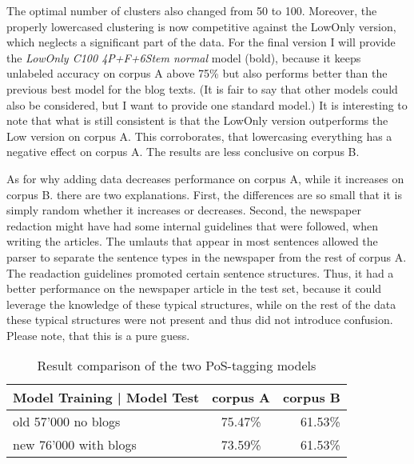 \documentclass[11pt,letterpaper, covington]{article}
\begin{document}
The optimal number of clusters also changed from 50 to 100. Moreover, the properly lowercased clustering is now competitive against the LowOnly version, which neglects a significant part of the data. For the final version I will provide the \emph{LowOnly C100 4P+F+6Stem normal} model (bold), because it keeps unlabeled accuracy on corpus A above 75\% but also performs better than the previous best model for the blog texts. (It is fair to say that other models could also be considered, but I want to provide one standard model.) It is interesting to note that what is still consistent is that the LowOnly version outperforms the Low version on corpus A. This corroborates, that lowercasing everything has a negative effect on corpus A. The results are less conclusive on corpus B.


As for why adding data decreases performance on corpus A, while it increases on corpus B. there are two explanations. First, the differences are so small that it is simply random whether it increases or decreases. Second, the newspaper redaction might have had some internal guidelines that were followed, when writing the articles. The umlauts that appear in most sentences allowed the parser to separate the sentence types in the newspaper from the rest of corpus A. The readaction guidelines promoted certain sentence structures. Thus, it had a better performance on the newspaper article in the test set, because it could leverage the knowledge of these typical structures, while on the rest of the data these typical structures were not present and thus did not introduce confusion. Please note, that this is a pure guess.

\begin{table}
\center
  \begin{tabular}{ | l || c | r | }
    \hline
   \textbf{Model Training | Model Test} & \textbf{corpus A} & \textbf{corpus B}  \\ \hline 
old 57'000 no blogs& 75.47\% & 61.53\% \\
new 76'000 with blogs & 73.59\% & 61.53\% \\ \hline
  \end{tabular}
\caption{Result comparison of the two PoS-tagging models}
\label{tab:pos}
\end{table}
 
\end{document}
